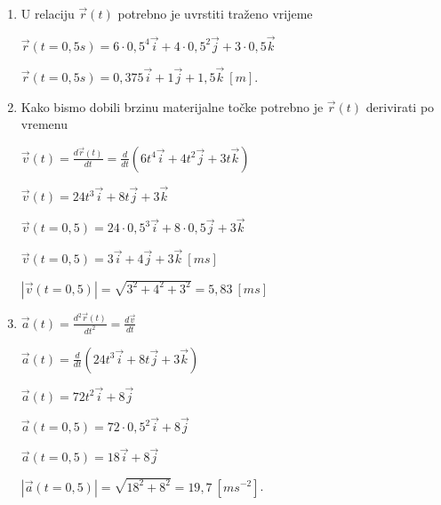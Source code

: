

\begin{enumerate}[label=\alph*)]
 \item U relaciju $\vec{r}(t)$ potrebno je uvrstiti traženo vrijeme
 
 $\vec{r}(t=0,5s)=6\cdot 0,5^4\vec{i}+4\cdot0,5^2\vec{j}+3\cdot0,5\vec{k}$
 
 $ \vec{r}(t=0,5s) = 0,375\vec{i}+1\vec{j}+1,5\vec{k}\ [m] $.
 
 \item  Kako bismo dobili brzinu materijalne točke potrebno je $\vec{r}(t)$ derivirati po vremenu 
 
 $\vec{v}(t)  = \frac{d\vec{r}(t)}{dt}=\frac{d}{dt}\left( 6t^4\vec{i}+4t^2\vec{j} + 3t\vec{k}  \right) $
 
 $\vec{v}(t) = 24t^3\vec{i}+8t\vec{j}+3\vec{k}  $
 
 $\vec{v}(t=0,5) = 24\cdot0,5^3\vec{i}+8\cdot0,5\vec{j}+3\vec{k}  $
 
 $\vec{v}(t=0,5) = 3\vec{i}+4\vec{j}+3\vec{k}\ [ms] $
 
 $|\vec{v}(t=0,5)| = \sqrt{3^2+4^2+3^2}=5,83\ [ms] $
 
 \item $\vec{a}(t)  = \frac{d^2\vec{r}(t)}{dt^2}=\frac{d\vec{v}}{dt}$
 
 $\vec{a}(t)  = \frac{d}{dt} \left(  24t^3\vec{i}+8t\vec{j}+3\vec{k} \right) $
 
 $ \vec{a}(t)  = 72t^2\vec{i}+8\vec{j}$
 
  $ \vec{a}(t=0,5)  = 72\cdot 0,5^2\vec{i}+8\vec{j}$
  
  $ \vec{a}(t=0,5)  = 18\vec{i}+8\vec{j}$
  
  $ |\vec{a}(t=0,5)|  = \sqrt{ 18^2+8^2}=19,7\ [ms^{-2}]$.
\end{enumerate}
